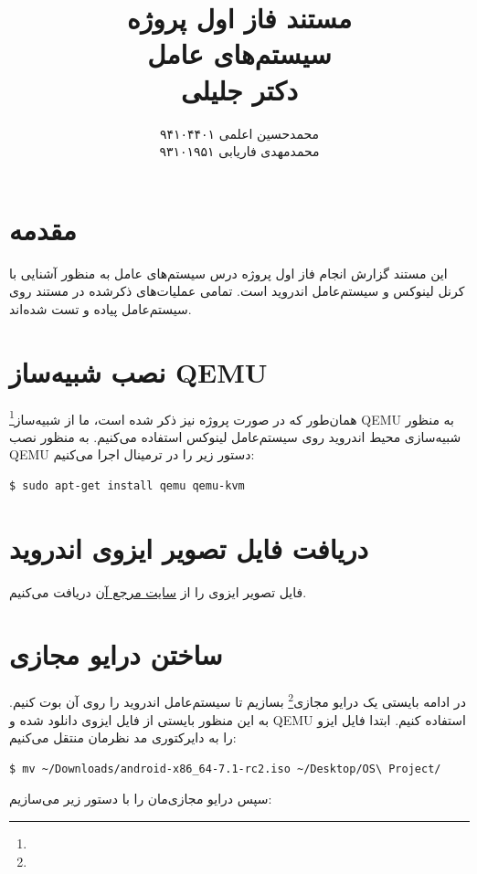 \documentclass{article}
\title{
مستند فاز اول پروژه
\\
\vspace{4mm}
سیستم‌های عامل
\\
\vspace{2mm}
دکتر جلیلی
}
\author{
محمدحسین اعلمی
\hspace{1cm}
۹۴۱۰۴۴۰۱
\\
محمدمهدی فاریابی
\hspace{1cm}
۹۳۱۰۱۹۵۱
}
\date{}
\begin{document}
\maketitle

\section*{مقدمه}
این مستند گزارش انجام فاز اول پروژه درس سیستم‌های عامل به منظور آشنایی با کرنل لینوکس و سیستم‌عامل اندروید است. تمامی عملیات‌های ذکر‌شده در مستند روی سیستم‌عامل
پیاده و تست‌ شده‌اند.

\section*{نصب شبیه‌ساز QEMU}
همان‌طور که در صورت پروژه نیز ذکر شده است، ما از شبیه‌ساز\footnote{} QEMU \cite{1} به منظور شبیه‌سازی محیط اندروید روی سیستم‌عامل لینوکس استفاده می‌کنیم. به منظور نصب QEMU دستور زیر را در ترمینال اجرا می‌کنیم:

\begin{latin}
\begin{verbatim}
$ sudo apt-get install qemu qemu-kvm
\end{verbatim}
\end{latin}

\section*{دریافت فایل تصویر ایزوی اندروید}
فایل تصویر ایزوی
را از 
\href{http://www.android-x86.org/}{سایت مرجع آن}
 دریافت می‌کنیم.
 
\section*{ساختن درایو مجازی}
در ادامه بایستی یک درایو مجازی\footnote{} بسازیم تا سیستم‌عامل اندروید را روی آن بوت کنیم. به این منظور بایستی از فایل ایزوی دانلود شده و QEMU استفاده کنیم. ابتدا فایل ایزو را به دایرکتوری مد نظرمان منتقل می‌کنیم:

\begin{latin}
\begin{verbatim}
$ mv ~/Downloads/android-x86_64-7.1-rc2.iso ~/Desktop/OS\ Project/
\end{verbatim}
\end{latin}

سپس درایو مجازی‌مان را با دستور زیر می‌سازیم:
\end{document}
